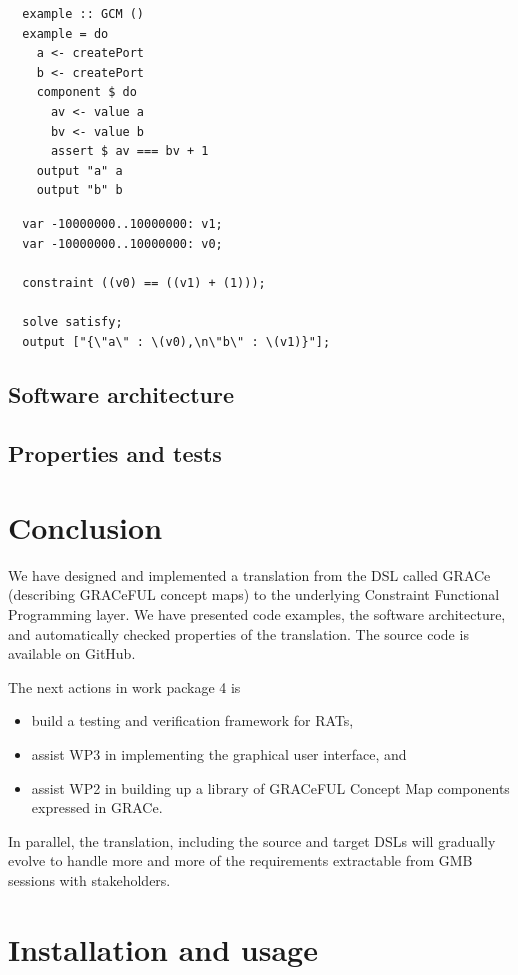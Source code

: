 \documentclass{article}
\begin{document}
\begin{verbatim}
  example :: GCM ()
  example = do
    a <- createPort
    b <- createPort
    component $ do
      av <- value a
      bv <- value b
      assert $ av === bv + 1
    output "a" a
    output "b" b
\end{verbatim}

\begin{verbatim}
  var -10000000..10000000: v1;
  var -10000000..10000000: v0;

  constraint ((v0) == ((v1) + (1)));

  solve satisfy;
  output ["{\"a\" : \(v0),\n\"b\" : \(v1)}"];
\end{verbatim}

\subsection{Software architecture}

\subsection{Properties and tests}

\section{Conclusion}

We have designed and implemented a translation from the DSL called
GRACe (describing GRACeFUL concept maps) to the underlying Constraint
Functional Programming layer.
%
We have presented code examples, the software architecture, and
automatically checked properties of the translation.
%
The source code is available on GitHub.

The next actions in work package 4 is
\begin{itemize}
\item build a testing and verification framework for RATs,
\item assist WP3 in implementing the graphical user interface, and
\item assist WP2 in building up a library of GRACeFUL Concept Map
  components expressed in GRACe.
\end{itemize}
%
In parallel, the translation, including the source and target DSLs
will gradually evolve to handle more and more of the requirements
extractable from GMB sessions with stakeholders.


\appendix
\section{Installation and usage}




\end{document}
